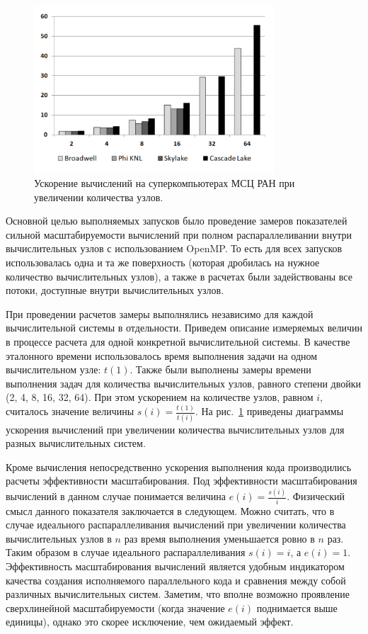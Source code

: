 \begin{figure}[ht]
\centering
\includegraphics[width=0.8\textwidth]{pics/text_2_scaling/speedup.pdf}
\caption{Ускорение вычислений на суперкомпьютерах МСЦ РАН при увеличении количества узлов.}
\label{fig:text_2_scaling_speedup}
\end{figure}

Основной целью выполняемых запусков было проведение замеров показателей сильной масштабируемости вычислений при полном распараллеливании внутри вычислительных узлов с использованием OpenMP.
То есть для всех запусков использовалась одна и та же поверхность (которая дробилась на нужное количество вычислительных узлов), а также в расчетах были задействованы все потоки, доступные внутри вычислительных узлов.

При проведении расчетов замеры выполнялись независимо для каждой вычислительной системы в отдельности.
Приведем описание измеряемых величин в процессе расчета для одной конкретной вычислительной системы.
В качестве эталонного времени использовалось время выполнения задачи на одном вычислительном узле: $t(1)$.
Также были выполнены замеры времени выполнения задач для количества вычислительных узлов, равного степени двойки (2, 4, 8, 16, 32, 64).
При этом ускорением на количестве узлов, равном $i$, считалось значение величины $s(i) = \frac{t(1)}{t(i)}$.
На рис.~\ref{fig:text_2_scaling_speedup} приведены диаграммы ускорения вычислений при увеличении количества вычислительных узлов для разных вычислительных систем.

Кроме вычисления непосредственно ускорения выполнения кода производились расчеты эффективности масштабирования.
Под эффективности масштабирования вычислений в данном случае понимается величина $e(i) = \frac{s(i)}{i}$.
Физический смысл данного показателя заключается в следующем.
Можно считать, что в случае идеального распараллеливания вычислений при увеличении количества вычислительных узлов в $n$ раз время выполнения уменьшается ровно в $n$ раз.
Таким образом в случае идеального распараллеливания $s(i) = i$, а $e(i) = 1$.
Эффективность масштабирования вычислений является удобным индикатором качества создания исполняемого параллельного кода и сравнения между собой различных вычислительных систем.
Заметим, что вполне возможно проявление сверхлинейной масштабируемости (когда значение $e(i)$ поднимается выше единицы), однако это скорее исключение, чем ожидаемый эффект.

